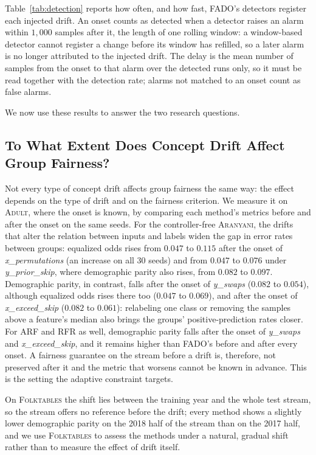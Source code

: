 \documentclass[conference]{IEEEtran}
\newcommand{\fado}{\textsc{FADO}}
\newcommand{\ara}{\textsc{Aranyani}}
\newcommand{\arf}{\textsc{ARF}}
\newcommand{\rfr}{\textsc{RFR}}
\newcommand{\adult}{\textsc{Adult}}
\newcommand{\folk}{\textsc{Folktables}}
\begin{document}
Table~\ref{tab:detection} reports how often, and how fast, \fado{}'s detectors register each injected drift. An onset counts as detected when a detector raises an
alarm within $1{,}000$ samples after it, the length of one rolling window: a window-based detector cannot register a change before its window has refilled, so a later
alarm is no longer attributed to the injected drift. The delay is the mean number of samples from the onset to that alarm over the detected runs only, so it must be
read together with the detection rate; alarms not matched to an onset count as false alarms.

We now use these results to answer the two research questions.

\subsection{To What Extent Does Concept Drift Affect Group Fairness?}
\label{sec:results:rq1}
Not every type of concept drift affects group fairness the same way: the effect depends on the type of drift and on the fairness criterion. We measure it on \adult{},
where the onset is known, by comparing each method's metrics before and after the onset on the same seeds. For the controller-free \ara{}, the drifts that alter the
relation between inputs and labels widen the gap in error rates between groups: equalized odds rises from $0.047$ to $0.115$ after the onset of
\emph{x\_permutations} (an increase on all $30$ seeds) and from $0.047$ to $0.076$ under \emph{y\_prior\_skip}, where demographic parity also rises, from $0.082$
to $0.097$. Demographic parity, in contrast, falls after the onset of \emph{y\_swaps} ($0.082$ to $0.054$), although equalized odds rises there too ($0.047$
to $0.069$), and after the onset of \emph{x\_exceed\_skip} ($0.082$ to $0.061$): relabeling one class or removing the samples above a feature's median also brings
the groups' positive-prediction rates closer. For \arf{} and \rfr{} as well, demographic parity falls after the onset of
\emph{y\_swaps} and \emph{x\_exceed\_skip}, and it remains higher than \fado{}'s before and after every onset. A fairness guarantee on
the stream before a drift is, therefore, not preserved after it and the metric that worsens cannot be known in advance. This is the setting the adaptive
constraint targets.

On \folk{} the shift lies between the training year and the whole test stream, so the stream offers no reference before the drift; every method shows a slightly
lower demographic parity on the 2018 half of the stream than on the 2017 half, and we use \folk{} to assess the methods under a natural, gradual shift rather than to
measure the effect of drift itself.
\end{document}
